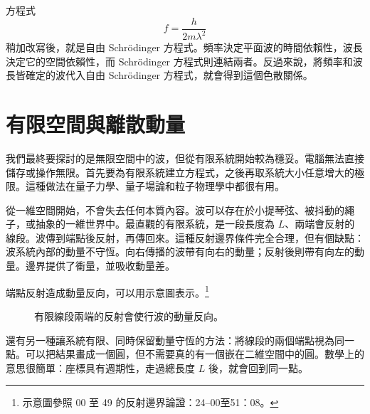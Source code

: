 方程式
\begin{equation}
f=\frac{h}{2m\lambda^2}
\end{equation}
稍加改寫後，就是自由 Schr\"odinger 方程式。頻率決定平面波的時間依賴性，波長決定它的空間依賴性，而 Schr\"odinger 方程式則連結兩者。反過來說，將頻率和波長皆確定的波代入自由 Schr\"odinger 方程式，就會得到這個色散關係。

\begin{classroomqa}
\end{classroomqa}

\section{有限空間與離散動量}

我們最終要探討的是無限空間中的波，但從有限系統開始較為穩妥。電腦無法直接儲存或操作無限。首先要為有限系統建立方程式，之後再取系統大小任意增大的極限。這種做法在量子力學、量子場論和粒子物理學中都很有用。

從一維空間開始，不會失去任何本質內容。波可以存在於小提琴弦、被抖動的繩子，或抽象的一維世界中。最直觀的有限系統，是一段長度為 \(L\)、兩端會反射的線段。波傳到端點後反射，再傳回來。這種反射邊界條件完全合理，但有個缺點：波系統內部的動量不守恆。向右傳播的波帶有向右的動量；反射後則帶有向左的動量。邊界提供了衝量，並吸收動量差。

端點反射造成動量反向，可以用示意圖表示。\footnote{示意圖參照 00 至 49 的反射邊界論證：24--00至51：08。}

\begin{figure}[t]
\centering
{}
\caption{有限線段兩端的反射會使行波的動量反向。}
\end{figure}

還有另一種讓系統有限、同時保留動量守恆的方法：將線段的兩個端點視為同一點。可以把結果畫成一個圓，但不需要真的有一個嵌在二維空間中的圓。數學上的意思很簡單：座標具有週期性，走過總長度 \(L\) 後，就會回到同一點。

